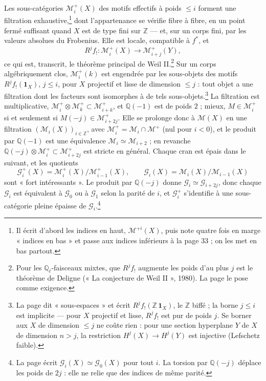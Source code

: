 \documentclass[11pt,a4paper]{article}
\begin{document}
Les sous-catégories $\mathcal{M}^{+}_{i}(X)$ des motifs effectifs à poids
$\leqslant i$ forment une filtration exhaustive,\footnote{Il écrit d'abord
les indices en haut, $\mathcal{M}^{+i}(X)$, puis note quatre fois en marge
« indices en bas » et passe aux indices inférieurs à la page 33 ; on les met en
bas partout.} dont l'appartenance se vérifie fibre à fibre, en un point fermé
suffisant quand $X$ est de type fini sur $\mathbb{Z}$ --- et, sur un corps fini, par les valeurs
absolues du Frobenius. Elle est locale, compatible à $f^{*}$, et
\[
R^{j}f_{!} \colon \mathcal{M}^{+}_{i}(X) \longrightarrow \mathcal{M}^{+}_{i+j}(Y) ,
\]
ce qui est, transcrit, le théorème principal de Weil II.\footnote{Pour les
$\mathbb{Q}_{\ell}$-faisceaux mixtes, que $R^{j}f_{!}$ augmente les poids d'au
plus $j$ est le théorème de Deligne (« La conjecture de Weil II », 1980). La
page le pose comme exigence.} Sur un corps algébriquement clos,
$\mathcal{M}^{+}_{i}(k)$ est engendrée par les sous-objets des motifs
$R^{j}f_{!}(\mathbf{1}_{X})$, $j \leqslant i$, pour $X$ projectif et lisse de
dimension $\leqslant j$ : tout objet a une filtration dont les facteurs sont
isomorphes à de tels sous-objets.\footnote{La page dit « sous-espaces » et
écrit $R^{j}f_{!}(\mathbb{Z}\,\mathbf{1}_{X})$, le $\mathbb{Z}$ biffé ; la
borne $j \leqslant i$ est implicite --- pour $X$ projectif et lisse,
$R^{j}f_{!}$ est pur de poids $j$. Se borner aux $X$ de dimension
$\leqslant j$ ne coûte rien : pour une section hyperplane $Y$ de $X$ de
dimension $n > j$, la restriction $H^{j}(X) \to H^{j}(Y)$ est injective
(Lefschetz faible).} La filtration est multiplicative, $\mathcal{M}^{+}_{i} \otimes
\mathcal{M}^{+}_{k} \subset \mathcal{M}^{+}_{i+k}$, et $\mathbb{Q}(-1)$ est de
poids $2$ ; mieux, $M \in \mathcal{M}^{+}_{i}$ si et seulement si $M(-j) \in
\mathcal{M}^{+}_{i+2j}$. Elle se prolonge donc à $\mathcal{M}(X)$ en une filtration
$(\mathcal{M}_{i}(X))_{i \in \mathbb{Z}}$, avec $\mathcal{M}^{+}_{i} =
\mathcal{M}_{i} \cap \mathcal{M}^{+}$ (nul pour $i < 0$), et le produit par
$\mathbb{Q}(-1)$ est une équivalence $\mathcal{M}_{i} \simeq \mathcal{M}_{i+2}$ ;
en revanche $\mathbb{Q}(-j) \otimes \mathcal{M}^{+}_{i} \subset
\mathcal{M}^{+}_{i+2j}$ est stricte en général. Chaque cran est épais dans le
suivant, et les quotients
\[
\mathcal{G}^{+}_{i}(X) = \mathcal{M}^{+}_{i}(X) / \mathcal{M}^{+}_{i-1}(X) ,
\qquad
\mathcal{G}_{i}(X) = \mathcal{M}_{i}(X) / \mathcal{M}_{i-1}(X)
\]
sont « fort intéressants ». Le produit par $\mathbb{Q}(-j)$ donne
$\mathcal{G}_{i} \simeq \mathcal{G}_{i+2j}$, donc chaque $\mathcal{G}_{i}$ est
équivalent à $\mathcal{G}_{0}$ ou à $\mathcal{G}_{1}$ selon la parité de $i$, et
$\mathcal{G}^{+}_{i}$ s'identifie à une sous-catégorie pleine épaisse de
$\mathcal{G}_{i}$.\footnote{La page écrit $\mathcal{G}_{i}(X) \simeq
\mathcal{G}_{0}(X)$ pour tout $i$. La torsion par $\mathbb{Q}(-j)$ déplace les
poids de $2j$ : elle ne relie que des indices de même parité.}
\end{document}
